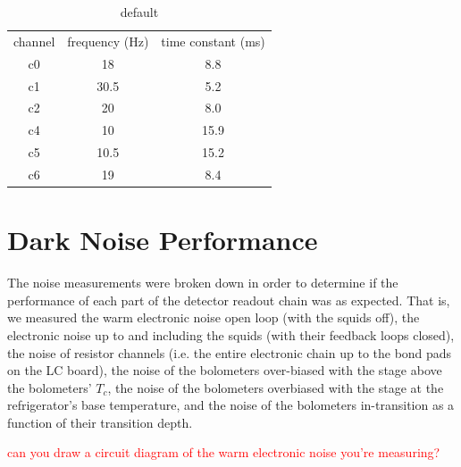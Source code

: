 \begin{table}[htp]
\caption{default}
\begin{center}
\begin{tabular}{|c|c|c|}
channel & frequency (Hz) & time constant (ms) \\
c0 & 18 & 8.8 \\
c1 & 30.5 & 5.2 \\
c2 & 20 & 8.0 \\
c4 & 10 & 15.9 \\
c5 & 10.5 & 15.2 \\
c6 & 19 & 8.4 \\
\end{tabular}
\end{center}
\label{IR LED time constants for one comb of bolometers on 150-02, dark in \ac{ETC}}
\end{table}%










\section{Dark Noise Performance}
\label{sec:dark_noise}

The noise measurements were broken down in order to determine if the performance of each part of the detector readout chain was as expected. 
That is, we measured the warm electronic noise open loop (with the squids off), the electronic noise up to and including the squids (with their feedback loops closed), the noise of resistor channels (i.e. the entire electronic chain up to the bond pads on the \ac{LC} board), the noise of the bolometers over-biased with the stage above the bolometers' $T_{c}$, the noise of the bolometers overbiased with the stage at the refrigerator's base temperature, and the noise of the bolometers in-transition as a function of their transition depth. 



\textcolor{red}{can you draw a circuit diagram of the warm electronic noise you're measuring?}

